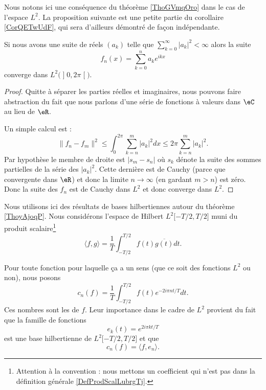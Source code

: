 Nous notons ici une conséquence du théorème \ref{ThoGVmqOro} dans le cas de l'espace \( L^2\). La proposition suivante est une petite partie du corollaire \ref{CorQETwUdF}, qui sera d'ailleurs démontré de façon indépendante.

\begin{proposition}
    Si nous avons une suite de réels \( (a_k)\) telle que \( \sum_{k=0}^{\infty}| a_k |^2<\infty\) alors la suite
    \begin{equation}
        f_n(x)=\sum_{k=0}^na_k e^{ikx}
    \end{equation}
    converge dans \( L^2\big( \mathopen] 0 , 2\pi \mathclose[ \big)\).
\end{proposition}

\begin{proof}
    Quitte à séparer les parties réelles et imaginaires, nous pouvons faire abstraction du fait que nous parlons d'une série de fonctions à valeurs dans \( \eC\) au lieu de \( \eR\).

    Un simple calcul est :
    \begin{equation}    \label{EqHVdJxZT}
        \| f_n-f_m \|^2\leq\int_0^{2\pi}\sum_{k=n}^m| a_k |^2dx\leq 2\pi\sum_{k=n}^m| a_k |^2.
    \end{equation}
    Par hypothèse le membre de droite est \( | s_m-s_n |\) où \( s_k\) dénote la suite des sommes partielles de la série des \( | a_k |^2\). Cette dernière est de Cauchy (parce que convergente dans \( \eR\)) et donc la limite \( n\to\infty\) (en gardant \( m>n\)) est zéro. Donc la suite des \( f_n\) est de Cauchy dans \( L^2\) et donc converge dans \( L^2\).
\end{proof}


Nous utilisons ici des résultats de bases hilbertiennes autour du théorème \ref{ThoyAjoqP}. Nous considérons l'espace de Hilbert \( L^2\mathopen[ -T/2 , T/2 \mathclose]\) muni du produit scalaire\footnote{Attention à la convention : nous mettons un coefficient qui n'est pas dans la définition générale \eqref{DefProdScalLubrgTj}.}
\begin{equation}    \label{EqQBcpyyJ}
    \langle f, g\rangle =\frac{1}{ T }\int_{-T/2}^{T/2}f(t)\overline{ g(t) }dt.
\end{equation}


Pour toute fonction pour laquelle ça a un sens (que ce soit des fonctions \( L^2\) ou non), nous posons
\begin{equation}\label{EqhIPoPH}
    c_n(f)=\frac{1}{ T }\int_{-T/2}^{T/2}f(t) e^{-2i\pi nt/T}dt.
\end{equation}
Ces nombres sont les  de \( f\). Leur importance dans le cadre de \( L^2\) provient du fait que la famille de fonctions
\begin{equation}
    e_k(t)=  e^{2i\pi kt/T}
\end{equation}
est une base hilbertienne de \( L^2\mathopen[ -T/2 , T/2 \mathclose]\) et que
\begin{equation}
    c_n(f)=\langle f, e_n\rangle .
\end{equation}

